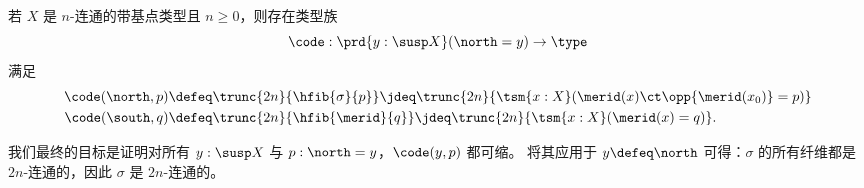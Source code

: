 \begin{defn}\label{thm:freudcode}
  若 $X$ 是 $n$-连通的带基点类型且 $n\geq 0$，则存在类型族
  \begin{equation}
    \code:\prd{y:\susp X} (\north=y) \to \type\label{eq:freudcode}
  \end{equation}
  满足
  \begin{align}
    \code(\north,p) &\defeq \trunc{2n}{\hfib{\sigma}{p}}
    \jdeq \trunc{2n}{\tsm{x:X} (\merid(x) \ct \opp{\merid(x_0)} = p)}\label{eq:freudcodeN}\\
    \code(\south,q) &\defeq \trunc{2n}{\hfib{\merid}{q}}
    \jdeq \trunc{2n}{\tsm{x:X} (\merid(x) = q)}.\label{eq:freudcodeS}
  \end{align}
\end{defn}

我们最终的目标是证明对所有 $y:\susp X$ 与 $p:\north=y$，$\code(y,p)$ 都可缩。
将其应用于 $y\defeq \north$ 可得：$\sigma$ 的所有纤维都是 $2n$-连通的，因此 $\sigma$ 是 $2n$-连通的。

